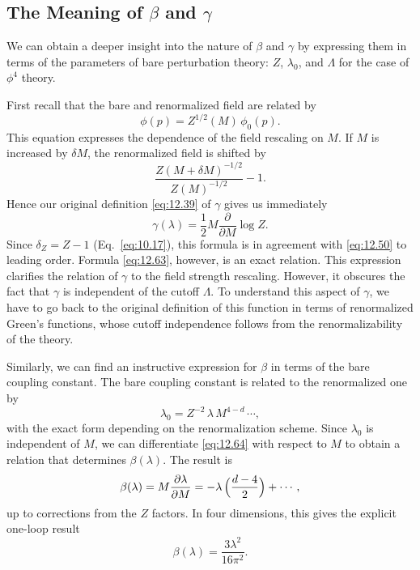 \subsection{The Meaning of $\beta$ and $\gamma$}

We can obtain a deeper insight into the nature of $\beta$ and $\gamma$ by
expressing them in terms of the parameters of bare perturbation theory: $Z$,
$\lambda_0$, and $\Lambda$ for the case of $\phi^4$ theory.

First recall that the bare and renormalized field are related by
\begin{equation}
  \phi(p) = Z^{1/2}(M)\,\phi_0(p) .
  \label{eq:12.62}
\end{equation}
This equation expresses the dependence of the field rescaling on $M$.  If $M$
is increased by $\delta M$, the renormalized field is shifted by
\begin{equation}
  \frac{Z(M+\delta M)^{-1/2}}{Z(M)^{-1/2}} - 1 .
\end{equation}
Hence our original definition \eqref{eq:12.39} of $\gamma$ gives us
immediately
\begin{equation}
  \gamma(\lambda) = \frac{1}{2}M\frac{\partial}{\partial M}\log Z .
  \label{eq:12.63}
\end{equation}
Since $\delta_Z = Z - 1$ (Eq.~\eqref{eq:10.17}), this formula is in agreement
with \eqref{eq:12.50} to leading order.  Formula \eqref{eq:12.63}, however, is
an exact relation.  This expression clarifies the relation of $\gamma$ to the
field strength rescaling.  However, it obscures the fact that $\gamma$ is
independent of the cutoff $\Lambda$.  To understand this aspect of $\gamma$,
we have to go back to the original definition of this function in terms of
renormalized Green's functions, whose cutoff independence follows from the
renormalizability of the theory.

Similarly, we can find an instructive expression for $\beta$ in terms of the
bare coupling constant.  The bare coupling constant is related to the
renormalized one by
\begin{equation}
  \lambda_0 = Z^{-2}\,\lambda\,M^{4-d}\,\cdots ,
  \label{eq:12.64}
\end{equation}
with the exact form depending on the renormalization scheme.  Since
$\lambda_0$ is independent of $M$, we can differentiate \eqref{eq:12.64}
with respect to $M$ to obtain a relation that determines $\beta(\lambda)$.
The result is
\begin{equation}
  \beta(\lambda) = M\frac{\partial\lambda}{\partial M}
  = -\lambda\,\Bigl( \frac{d-4}{2} \Bigr) + \cdots ,
  \label{eq:12.66}
\end{equation}
up to corrections from the $Z$ factors.  In four dimensions, this gives the
explicit one-loop result
\begin{equation}
  \beta(\lambda) = \frac{3\lambda^2}{16\pi^2} .
  \label{eq:12.46}
\end{equation}

